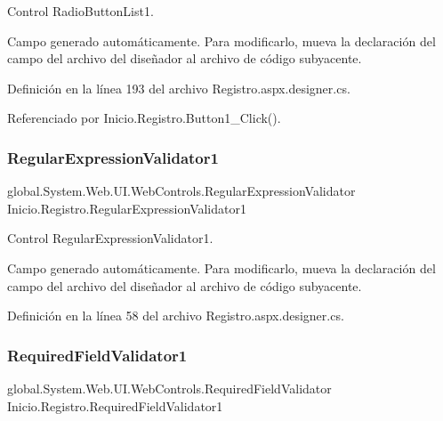 Control Radio\+Button\+List1. 

Campo generado automáticamente. Para modificarlo, mueva la declaración del campo del archivo del diseñador al archivo de código subyacente. 

Definición en la línea 193 del archivo Registro.\+aspx.\+designer.\+cs.



Referenciado por Inicio.\+Registro.\+Button1\+\_\+\+Click().

\mbox{\label{classInicio_1_1Registro_a1d327341db3c92117be1c5e828fe2bf9}} 
\subsubsection{\texorpdfstring{RegularExpressionValidator1}{RegularExpressionValidator1}}
{\footnotesize\ttfamily global.\+System.\+Web.\+U\+I.\+Web\+Controls.\+Regular\+Expression\+Validator Inicio.\+Registro.\+Regular\+Expression\+Validator1\hspace{0.3cm}{\ttfamily [protected]}}



Control Regular\+Expression\+Validator1. 

Campo generado automáticamente. Para modificarlo, mueva la declaración del campo del archivo del diseñador al archivo de código subyacente. 

Definición en la línea 58 del archivo Registro.\+aspx.\+designer.\+cs.

\mbox{\label{classInicio_1_1Registro_af596d0fdac782957e6f85a4e5d8f3ee3}} 
\subsubsection{\texorpdfstring{RequiredFieldValidator1}{RequiredFieldValidator1}}
{\footnotesize\ttfamily global.\+System.\+Web.\+U\+I.\+Web\+Controls.\+Required\+Field\+Validator Inicio.\+Registro.\+Required\+Field\+Validator1\hspace{0.3cm}{\ttfamily [protected]}}




